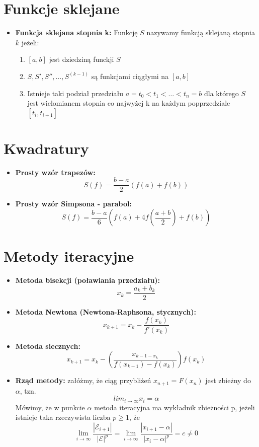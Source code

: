 \documentclass[11pt]{article}
\begin{document}
\section{Funkcje sklejane}
\begin{itemize}
    \item \textbf{Funkcja sklejana stopnia k: }Funkcję $S$ nazywamy funkcją sklejaną stopnia $k$ jeżeli:
    \begin{enumerate}
        \item $[a,b]$ jest dziedziną funckji $S$
        \item $S, S', S'', \dots , S^{(k-1)}$ są funkcjami ciągłymi na $[a,b]$
        \item Istnieje taki podział przedziału $a=t_0<t_1<\dots<t_n=b$ dla którego $S$ jest wielomianem stopnia co najwyżej k na każdym popprzedziale $[t_i, t_{i+1}]$
    \end{enumerate}
\end{itemize}

\section{Kwadratury}
\begin{itemize}
    \item \textbf{Prosty wzór trapezów: }
    \[S(f) = \frac{b-a}{2}(f(a)+f(b))\]
    \item  \textbf{Prosty wzór Simpsona - parabol: }
    \[S(f) = \frac{b-a}{6}(f(a) + 4f(\frac{a+b}{2}) + f(b))\]
\end{itemize}

\section{Metody iteracyjne}
\begin{itemize}
    \item \textbf{Metoda bisekcji (poławiania przedziału): }
    \[x_k = \frac{a_k + b_k}{2}\]
    \item \textbf{Metoda Newtona (Newtona-Raphsona, stycznych): }
    \[x_{k+1} = x_k - \frac{f(x_k)}{f'(x_k)}\]
    \item \textbf{Metoda siecznych: }
    \[x_{k+1} = x_k - (\frac{x_{k-1-x_k}}{f(x_{k-1}) - f(x_k)})f(x_k)\]
    \item \textbf{Rząd metody: }załóżmy, że ciąg przybliżeń $x_{n+1} = F(x_n)$ jest zbieżny do $\alpha$, tzn.
    \[lim_{i \to \infty} x_i = \alpha\]
    Mówimy, że w punkcie $\alpha$ metoda iteracyjna ma wykładnik zbieżności p, jeżeli istnieje taka rzeczywista liczba $p \geq 1$, że 
    \[\lim_{i\to\infty}\frac{|\mathcal{E}_{i+1}|}{|\mathcal{E}|^p} = \lim_{i\to\infty}\frac{|x_{i+1} - \alpha|}{|x_i - \alpha|^p} = c \neq 0\]
\end{itemize}
\end{document}
